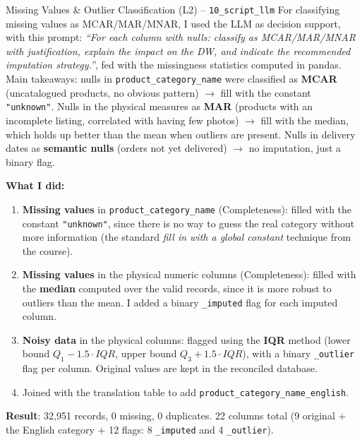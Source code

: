 \documentclass[12pt,a4paper]{article}
\begin{document}
\begin{aibox}{Missing Values \& Outlier Classification (L2) -- \texttt{10\_script\_llm}}
For classifying missing values as MCAR/MAR/MNAR, I used the LLM as decision support,
with this prompt: \textit{``For each column with nulls: classify as MCAR/MAR/MNAR
with justification, explain the impact on the DW, and indicate the recommended
imputation strategy.''}, fed with the missingness statistics computed in pandas.
Main takeaways: nulls in \texttt{product\_category\_name} were classified as
\textbf{MCAR} (uncatalogued products, no obvious pattern) $\to$ fill with the
constant \texttt{"unknown"}. Nulls in the physical measures as \textbf{MAR}
(products with an incomplete listing, correlated with having few photos) $\to$ fill
with the median, which holds up better than the mean when outliers are present.
Nulls in delivery dates as \textbf{semantic nulls} (orders not yet delivered) $\to$
no imputation, just a binary flag.
\end{aibox}

\textbf{What I did:}
\begin{enumerate}
  \item \textbf{Missing values} in \texttt{product\_category\_name} (Completeness):
        filled with the constant \texttt{"unknown"}, since there is no way to guess
        the real category without more information (the standard \textit{fill in
        with a global constant} technique from the course).

  \item \textbf{Missing values} in the physical numeric columns (Completeness):
        filled with the \textbf{median} computed over the valid records, since it is
        more robust to outliers than the mean. I added a binary \texttt{\_imputed}
        flag for each imputed column.

  \item \textbf{Noisy data} in the physical columns: flagged using the \textbf{IQR}
        method (lower bound $Q_1 - 1.5 \cdot IQR$, upper bound $Q_3 + 1.5 \cdot IQR$),
        with a binary \texttt{\_outlier} flag per column. Original values are kept in
        the reconciled database.

  \item Joined with the translation table to add
        \texttt{product\_category\_name\_english}.
\end{enumerate}

\textbf{Result}: 32,951 records, 0 missing, 0 duplicates. 22 columns total (9
original $+$ the English category $+$ 12 flags: 8 \texttt{\_imputed} and 4
\texttt{\_outlier}).
\end{document}
